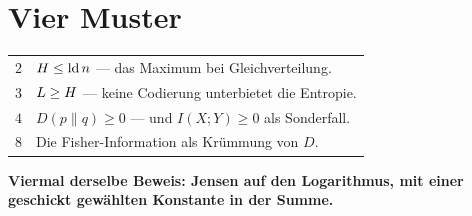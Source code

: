 \section{Vier Muster}

\begin{merksatz}
\begin{center}
{\small
\renewcommand{\arraystretch}{1.48}
\begin{tabular}{@{}P{1.8cm}P{6.6cm}@{}}
\toprule
$2$ & $H \le \operatorname{ld} n$ --- das Maximum bei Gleichverteilung.\\
$3$ & $L \ge H$ --- keine Codierung unterbietet die Entropie.\\
$4$ & $D(p\|q) \ge 0$ --- und $I(X;Y)\ge0$ als Sonderfall.\\
$8$ & Die Fisher-Information als Krümmung von $D$.\\
\bottomrule
\end{tabular}}
\end{center}

\begin{center}
\begin{minipage}{0.9\textwidth}
\textbf{Viermal derselbe Beweis: Jensen auf den Logarithmus, mit einer geschickt gewählten Konstante in der Summe.}
\end{minipage}
\end{center}

\begin{center}
\begin{minipage}{0.88\textwidth}
\end{minipage}
\end{center}
\end{merksatz}

